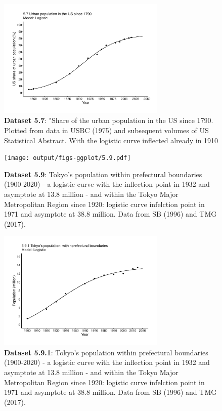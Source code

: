 \documentclass[aps,rmp,preprint,superscriptaddress,10pt,onecolumn]{article}
\begin{document}
\begin{figure}[h]
\includegraphics[width=8cm]{output/figs-ggplot/5.7.pdf}
\caption{\textbf{Dataset 5.7}: "Share of the urban population in the US since 1790. Plotted from data in USBC (1975) and subsequent volumes of US Statistical Abstract. With the logistic curve inflected already in 1910}
\end{figure}
	
\begin{figure}[h]
\texttt{[image: output/figs-ggplot/5.9.pdf]}
\caption{\textbf{Dataset 5.9}: Tokyo's population within prefectural boundaries (1900-2020) - a logistic curve with the inflection point in 1932 and asymptote at 13.8 million - and within the Tokyo Major Metropolitan Region since 1920: logistic curve infelction point in 1971 and asymptote at 38.8 million. Data from SB (1996) and TMG (2017). }
\end{figure}
	
\begin{figure}[h]
\includegraphics[width=8cm]{output/figs-ggplot/5.9.1.pdf}
\caption{\textbf{Dataset 5.9.1}: Tokyo's population within prefectural boundaries (1900-2020) - a logistic curve with the inflection point in 1932 and asymptote at 13.8 million - and within the Tokyo Major Metropolitan Region since 1920: logistic curve infelction point in 1971 and asymptote at 38.8 million. Data from SB (1996) and TMG (2017). }
\end{figure}
	
\end{document}

